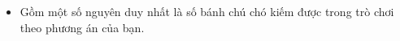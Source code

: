 \begin{itemize}
	\item     Gồm một số nguyên duy nhất là số bánh chú chó kiếm được trong trò chơi theo phương án của bạn.   
\end{itemize}